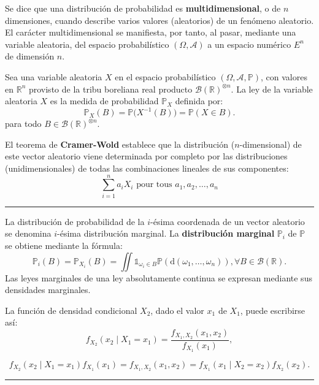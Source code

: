 \begin{f}
	
	
Se dice que una distribución de probabilidad es \textbf{multidimensional}, o de \(n\) dimensiones, cuando describe varios valores (aleatorios) de un fenómeno aleatorio.  
El carácter multidimensional se manifiesta, por tanto, al pasar, mediante una variable aleatoria, del espacio probabilístico \((\Omega,\mathcal{A})\) a un espacio numérico \(E^n\) de dimensión \(n\). 

Sea una variable aleatoria \(X\) en el espacio probabilístico \((\Omega, \mathcal A, \mathbb{P})\), con valores en \({\mathbb{R}}^n\) provisto de la tribu boreliana real producto \({\mathcal {B}(\mathbb{R})}^{\otimes n}\). 
La ley de la variable aleatoria \(X\) es la medida de probabilidad \(\mathbb{P}_X\) definida por:
\[
\mathbb{P}_X(B) = \mathbb{P}\big(X^{-1}(B)\big) = \mathbb{P}(X \in B).
\]
para todo \(B \in {\mathcal B(\mathbb R)}^{\otimes n}\).

El teorema de \textbf{Cramer-Wold} establece que la distribución (\(n\)-dimensional) de este vector aleatorio viene determinada por completo por las distribuciones (unidimensionales) de todas las combinaciones lineales de sus componentes: 
\[\sum_{i = 1}^n a_i X_i\mbox{ pour tous }a_1, a_2, \dots, a_n\]

\end{f}
\hrule

\begin{f}
La distribución de probabilidad de la \(i\)-ésima coordenada de un vector aleatorio se denomina \(i\)-ésima distribución marginal. La \textbf{distribución marginal} \(\mathbb{P}_i\) de \(\mathbb{P}\) se obtiene mediante la fórmula:
\[
\mathbb{P}_i(B) = \mathbb{P}_{X_i}(B) = \iint { \mathds{1}}_{\omega_i\in B} \mathbb{P}(\mathrm{d}(\omega_1,\dots,\omega_n)), \forall  B \in \mathcal B(\mathbb{R}).
\]
Las leyes marginales de una ley absolutamente continua se expresan mediante sus densidades marginales.



La función de densidad condicional \(X_2\), dado el valor \(x_1\) de \(X_1\), puede escribirse así:
\[
f_{X_2}(x_2 \mid X_1=x_1) = \frac{f_{X_1, X_2}(x_1,x_2)}{f_{X_1}(x_1)}, 
\]

\[
f_{X_2}(x_2 \mid X_1=x_1)f_{X_1}(x_1) = f_{X_1,X_2}(x_1, x_2) = f_{X_1}(x_1 \mid X_2=x_2)f_{X_2}(x_2). 
\]
\end{f}
\hrule

